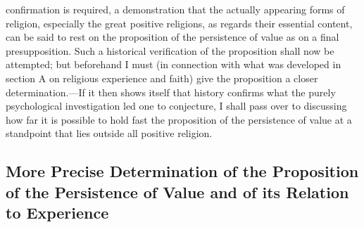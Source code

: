 \documentclass[12pt,a4paper]{book}
\begin{document}
confirmation is required, a demonstration that the actually appearing forms of religion, especially
the great positive religions, as regards their essential content, can be said to rest on the
proposition of the persistence of value as on a final presupposition. Such a historical verification
of the proposition shall now be attempted; but beforehand I must (in connection with what was
developed in section A on religious experience and faith) give the proposition a closer
determination.---If it then shows itself that history confirms what the purely psychological
investigation led one to conjecture, I shall pass over to discussing how far it is possible to hold
fast the proposition of the persistence of value at a standpoint that lies outside all positive
religion.

\subsection{More Precise Determination of the Proposition of the
  Persistence of Value and of its Relation to Experience}
\label{ssec:value-determination}
\end{document}
